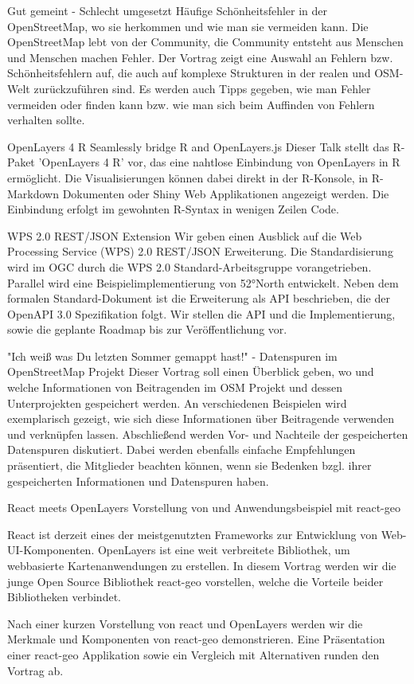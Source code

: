 
%
{Gut gemeint - Schlecht umgesetzt}%
{Häufige Schönheitsfehler in der OpenStreetMap, wo sie herkommen und wie man sie vermeiden kann.}%
{%
Die OpenStreetMap lebt von der Community, die Community entsteht aus Menschen und Menschen machen Fehler. Der Vortrag zeigt eine Auswahl an Fehlern bzw. Schönheitsfehlern auf, die auch auf komplexe Strukturen in der realen und OSM-Welt zurückzuführen sind. Es werden auch Tipps gegeben, wie man Fehler vermeiden oder finden kann bzw. wie man sich beim Auffinden von Fehlern verhalten sollte.%
}

%
{OpenLayers 4 R}%
{Seamlessly bridge R and OpenLayers.js}%
{%
Dieser Talk stellt das R-Paket 'OpenLayers 4 R' vor, das eine nahtlose Einbindung von OpenLayers in R ermöglicht. Die Visualisierungen können dabei direkt in der R-Konsole, in R-Markdown Dokumenten oder Shiny Web Applikationen angezeigt werden. Die Einbindung erfolgt im gewohnten R-Syntax in wenigen Zeilen Code.%
}

%
{WPS 2.0 REST/JSON Extension}%
{}%
{%
Wir geben einen Ausblick auf die Web Processing Service (WPS) 2.0 REST/JSON Erweiterung. Die Standardisierung wird im OGC durch die WPS 2.0 Standard-Arbeitsgruppe vorangetrieben. Parallel wird eine Beispielimplementierung von 52°North entwickelt. Neben dem formalen Standard-Dokument ist die Erweiterung als API beschrieben, die der OpenAPI 3.0 Spezifikation folgt. Wir stellen die API und die Implementierung, sowie die geplante Roadmap bis zur Veröffentlichung vor.%
}

%
{"Ich weiß was Du letzten Sommer gemappt hast!" - Datenspuren im OpenStreetMap Projekt}%
{}%
{%
Dieser Vortrag soll einen Überblick geben, wo und welche Informationen von Beitragenden im OSM Projekt und dessen Unterprojekten gespeichert werden. An verschiedenen Beispielen wird exemplarisch gezeigt, wie sich diese Informationen über Beitragende verwenden und verknüpfen lassen. Abschließend werden Vor- und Nachteile der gespeicherten Datenspuren diskutiert. Dabei werden ebenfalls einfache Empfehlungen präsentiert, die Mitglieder beachten können, wenn sie Bedenken bzgl. ihrer gespeicherten Informationen und Datenspuren haben.%
}

%
{React meets OpenLayers}%
{Vorstellung von und Anwendungsbeispiel mit react-geo}%
{%
React ist derzeit eines der meistgenutzten Frameworks zur Entwicklung von
Web-UI-Komponenten. OpenLayers ist eine weit verbreitete Bibliothek, um
webbasierte Kartenanwendungen zu erstellen. In diesem Vortrag werden wir die
junge Open Source Bibliothek react-geo vorstellen, welche die Vorteile beider 
Bibliotheken verbindet.

Nach einer kurzen Vorstellung von react und OpenLayers werden wir die Merkmale
und Komponenten von react-geo demonstrieren. Eine Präsentation einer react-geo 
Applikation sowie ein Vergleich mit Alternativen runden den Vortrag ab.%
}

